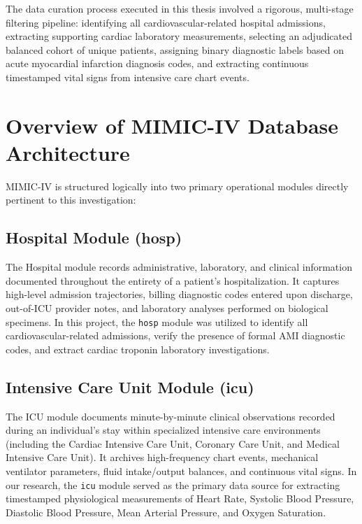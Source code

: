 \documentclass[12pt,a4paper,oneside]{report}
\begin{document}
The data curation process executed in this thesis involved a rigorous, multi-stage filtering pipeline: identifying all cardiovascular-related hospital admissions, extracting supporting cardiac laboratory measurements, selecting an adjudicated balanced cohort of unique patients, assigning binary diagnostic labels based on acute myocardial infarction diagnosis codes, and extracting continuous timestamped vital signs from intensive care chart events.

\section{Overview of MIMIC-IV Database Architecture}
\label{sec:mimic_overview}

MIMIC-IV is structured logically into two primary operational modules directly pertinent to this investigation:

\subsection{Hospital Module (hosp)}
\label{subsec:hosp_module}
The Hospital module records administrative, laboratory, and clinical information documented throughout the entirety of a patient's hospitalization. It captures high-level admission trajectories, billing diagnostic codes entered upon discharge, out-of-ICU provider notes, and laboratory analyses performed on biological specimens. In this project, the \texttt{hosp} module was utilized to identify all cardiovascular-related admissions, verify the presence of formal AMI diagnostic codes, and extract cardiac troponin laboratory investigations.

\subsection{Intensive Care Unit Module (icu)}
\label{subsec:icu_module}
The ICU module documents minute-by-minute clinical observations recorded during an individual's stay within specialized intensive care environments (including the Cardiac Intensive Care Unit, Coronary Care Unit, and Medical Intensive Care Unit). It archives high-frequency chart events, mechanical ventilator parameters, fluid intake/output balances, and continuous vital signs. In our research, the \texttt{icu} module served as the primary data source for extracting timestamped physiological measurements of Heart Rate, Systolic Blood Pressure, Diastolic Blood Pressure, Mean Arterial Pressure, and Oxygen Saturation.
\end{document}
